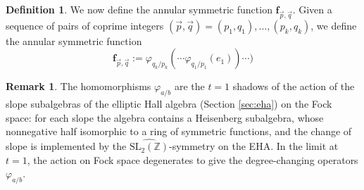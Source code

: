\documentclass{amsart}
\numberwithin{equation}{section}
\theoremstyle{definition}
\newtheorem{remark}[lemma]{Remark}%
\newtheorem{definition}[lemma]{Definition}%
\def\SL{{\mathrm{SL}}}
\newcommand{\frs}{\mathbf{f}_{\vec{p},\vec{q}}}
\newcommand{\fpq}{\frs}
\newcommand{\Z}{{\mathbb Z}}
\begin{document}
\begin{definition}
We now define the annular symmetric function $\fpq$. 
\label{def:introannularsym}
Given a sequence of pairs of coprime integers $(\vec{p},\vec{q})=(p_1,q_1),\ldots,(p_k,q_k)$, we define the annular symmetric function $$\frs:=\varphi_{q_k/p_k}(\cdots \varphi_{q_1/p_1}(e_1))\cdots)$$
\end{definition}
\begin{remark}\label{rmk:slopeoperators}
The homomorphisms $\varphi_{a/b}$ are the $t=1$ shadows of the action of the slope subalgebras of the elliptic Hall algebra (Section \ref{sec:eha}) on the Fock space: for each slope the algebra contains a Heisenberg subalgebra, whose nonnegative half isomorphic to a ring of symmetric functions, and the change of slope is implemented by the $\widehat{\SL_2(\Z)}$-symmetry on the EHA. In the limit at $t=1$, the action on Fock space degenerates to give the degree-changing operators $\varphi_{a/b}$.
\end{remark}
\end{document}
